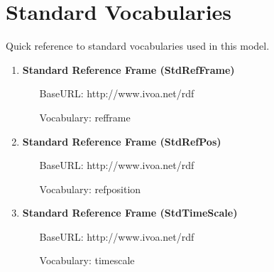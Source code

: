 \pagebreak
\section{Standard Vocabularies}
Quick reference to standard vocabularies used in this model.

  \begin{enumerate}
    \item \textbf{Standard Reference Frame (StdRefFrame)}
    \begin{itemize}
      \item[BaseURL:] http://www.ivoa.net/rdf
      \item[Vocabulary:] refframe
    \end{itemize}
    \item \textbf{Standard Reference Frame (StdRefPos)}
    \begin{itemize}
      \item[BaseURL:]  http://www.ivoa.net/rdf
      \item[Vocabulary:] refposition
    \end{itemize}
    \item \textbf{Standard Reference Frame (StdTimeScale)}
    \begin{itemize}
      \item[BaseURL:]  http://www.ivoa.net/rdf
      \item[Vocabulary:] timescale
    \end{itemize}
\end{enumerate}

